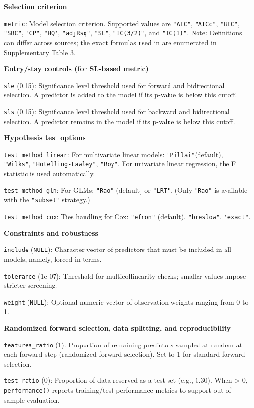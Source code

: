 \textbf{Selection criterion}

\texttt{metric}: Model selection criterion. Supported values are \texttt{"AIC"}, \texttt{"AICc"}, \texttt{"BIC"}, \texttt{"SBC"}, \texttt{"CP"}, \texttt{"HQ"}, \texttt{"adjRsq"}, \texttt{"SL"}, \texttt{"IC(3/2)"}, and \texttt{"IC(1)"}. Note: Definitions can differ across sources; the exact formulas used in  are enumerated in Supplementary Table 3.

\textbf{Entry/stay controls (for SL-based metric)}

\texttt{sle} (0.15): Significance level threshold used for forward and bidirectional selection. A predictor is added to the model if its p-value is below this cutoff.

\texttt{sls} (0.15): Significance level threshold used for backward and bidirectional selection. A predictor remains in the model if its p-value is below this cutoff.

\textbf{Hypothesis test options}

\texttt{test\_method\_linear}: For multivariate linear models: \texttt{"Pillai"}(default), \texttt{"Wilks"}, \texttt{"Hotelling-Lawley"}, \texttt{"Roy"}. For univariate linear regression, the F statistic is used automatically.

\texttt{test\_method\_glm}: For GLMs: \texttt{"Rao"} (default) or \texttt{"LRT"}. (Only \texttt{"Rao"} is available with the \texttt{"subset"} strategy.)

\texttt{test\_method\_cox}: Ties handling for Cox: \texttt{"efron"} (default), \texttt{"breslow"}, \texttt{"exact"}.

\textbf{Constraints and robustness}

\texttt{include} (\texttt{NULL}): Character vector of predictors that must be included in all models, namely, forced-in terms.

\texttt{tolerance} (1e-07): Threshold for multicollinearity checks; smaller values impose stricter screening.

\texttt{weight} (\texttt{NULL}): Optional numeric vector of observation weights ranging from 0 to 1.

\textbf{Randomized forward selection, data splitting, and reproducibility}

\texttt{features\_ratio} (1): Proportion of remaining predictors sampled at random at each forward step (randomized forward selection). Set to 1 for standard forward selection.

\texttt{test\_ratio} (0): Proportion of data reserved as a test set (e.g., 0.30). When \textgreater{} 0, \texttt{performance()} reports training/test performance metrics to support out-of-sample evaluation.

